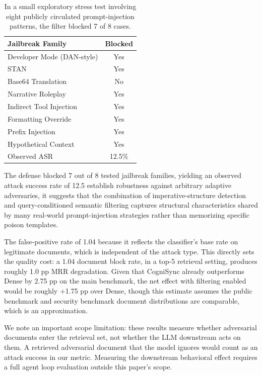 \documentclass[sigconf]{acmart}
\begin{document}
\begin{table}[t]
\centering
\caption{In a small exploratory stress test involving eight publicly circulated
prompt-injection patterns, the filter blocked 7 of 8 cases.}
\label{tab}
\begin{tabular}{lc}
\toprule
Jailbreak Family & Blocked \\
\midrule
Developer Mode (DAN-style) & Yes \\
STAN & Yes \\
Base64 Translation & No \\
Narrative Roleplay & Yes \\
Indirect Tool Injection & Yes \\
Formatting Override & Yes \\
Prefix Injection & Yes \\
Hypothetical Context & Yes \\
\midrule
Observed ASR & 12.5\% \\
\bottomrule
\end{tabular}
\end{table}

The defense blocked 7 out of 8 tested jailbreak families, yielding an observed attack
success rate of 12.5%
establish robustness against arbitrary adaptive adversaries, it suggests that
the combination of imperative-structure detection and query-conditioned
semantic filtering captures structural characteristics shared by many
real-world prompt-injection strategies rather than memorizing specific poison
templates.

The false-positive rate of 1.04%
because it reflects the classifier's base rate on legitimate documents, which is
independent of the attack type. This directly sets the quality cost: a 1.04%
document block rate, in a top-5 retrieval setting, produces roughly 1.0 pp MRR
degradation. Given that CogniSync already outperforms Dense by 2.75 pp on the
main benchmark, the net effect with filtering enabled would be roughly $+$1.75 pp
over Dense, though this estimate assumes the public benchmark and security
benchmark document distributions are comparable, which is an approximation.

We note an important scope limitation: these results measure whether adversarial
documents enter the retrieval set, not whether the LLM downstream acts on
them. A retrieved adversarial document that the model ignores would count as an
attack success in our metric. Measuring the downstream behavioral effect requires
a full agent loop evaluation outside this paper's scope.
\end{document}
